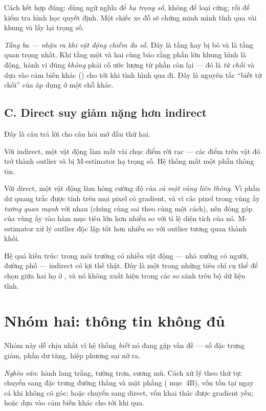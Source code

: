 \documentclass[../../vslam.tex]{subfiles}
\begin{document}
Cách kết hợp đúng: dùng ngữ nghĩa để \emph{hạ trọng số}, không để loại cứng; rồi để kiểm tra hình học quyết định. Một chiếc xe đỗ sẽ chứng minh mình tĩnh qua vài khung và lấy lại trọng số.

\emph{Tầng ba --- nhận ra khi vật động chiếm đa số.} Đây là tầng hay bị bỏ và là tầng quan trọng nhất. Khi tầng một và hai cùng báo rằng phần lớn khung hình là động, hành vi đúng \emph{không} phải cố ước lượng từ phần còn lại --- đó là \emph{từ chối} và dựa vào cảm biến khác () cho tới khi tình hình qua đi. Đây là nguyên tắc ``biết từ chối'' của  áp dụng ở một chỗ khác.

\subsection{C. Direct suy giảm nặng hơn indirect}

Đây là câu trả lời cho câu hỏi mở đầu thứ hai.

Với indirect, một vật động làm mất vài chục điểm rời rạc --- các điểm trên vật đó trở thành outlier và bị M-estimator hạ trọng số. Hệ thống mất một phần thông tin.

Với direct, một vật động làm hỏng cường độ của \emph{cả một vùng liên thông}. Vì phần dư quang trắc được tính trên mọi pixel có gradient, và vì các pixel trong vùng ấy \emph{tương quan mạnh} với nhau (chúng cùng sai theo cùng một cách), nên đóng góp của vùng ấy vào hàm mục tiêu lớn hơn nhiều so với tỉ lệ diện tích của nó. M-estimator xử lý outlier độc lập tốt hơn nhiều so với outlier tương quan thành khối.

Hệ quả kiến trúc: trong môi trường có nhiều vật động --- nhà xưởng có người, đường phố --- indirect có lợi thế thật. Đây là một trong những tiêu chí cụ thể để chọn giữa hai họ ở , và nó không xuất hiện trong các so sánh trên bộ dữ liệu tĩnh.

\section{Nhóm hai: thông tin không đủ}

Nhóm này dễ chịu nhất vì hệ thống \emph{biết} nó đang gặp vấn đề --- số đặc trưng giảm, phần dư tăng, hiệp phương sai nở ra.

\emph{Nghèo vân}: hành lang trắng, tường trơn, sương mù. Cách xử lý theo thứ tự: chuyển sang đặc trưng đường thẳng và mặt phẳng ( mục~4B), vốn tồn tại ngay cả khi không có góc; hoặc chuyển sang direct, vốn khai thác được gradient yếu; hoặc dựa vào cảm biến khác cho tới khi qua.
\end{document}
